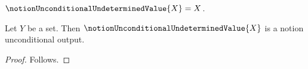 

\begin{definition}\label{notion_unconditional_undetermined_value}
    $\notionUnconditionalUndeterminedValue{X}=X$.
\end{definition}

\begin{classification}\label{notion_unconditional_undetermined_rejected}
    Let $Y$ be a set.
    Then $\notionUnconditionalUndeterminedValue{X}$ is a notion unconditional output.
\end{classification}
\begin{proof}
    Follows.
\end{proof}
